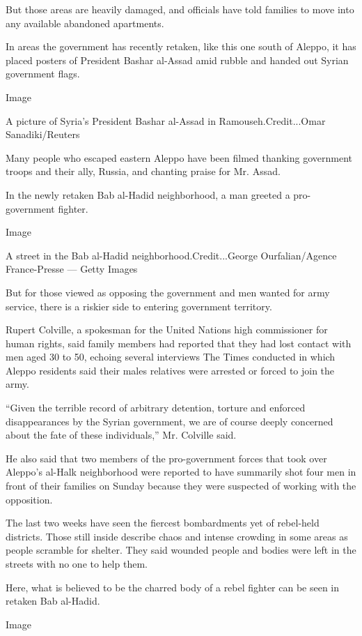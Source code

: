 But those areas are heavily damaged, and officials have told families to
move into any available abandoned apartments.

In areas the government has recently retaken, like this one south of
Aleppo, it has placed posters of President Bashar al-Assad amid rubble
and handed out Syrian government flags.

Image

A picture of Syria's President Bashar al-Assad in Ramouseh.Credit...Omar
Sanadiki/Reuters

Many people who escaped eastern Aleppo have been filmed thanking
government troops and their ally, Russia, and chanting praise for Mr.
Assad.

In the newly retaken Bab al-Hadid neighborhood, a man greeted a
pro-government fighter.

Image

A street in the Bab al-Hadid neighborhood.Credit...George
Ourfalian/Agence France-Presse --- Getty Images

But for those viewed as opposing the government and men wanted for army
service, there is a riskier side to entering government territory.

Rupert Colville, a spokesman for the United Nations high commissioner
for human rights, said family members had reported that they had lost
contact with men aged 30 to 50, echoing several interviews The Times
conducted in which Aleppo residents said their males relatives were
arrested or forced to join the army.

``Given the terrible record of arbitrary detention, torture and enforced
disappearances by the Syrian government, we are of course deeply
concerned about the fate of these individuals,'' Mr. Colville said.

He also said that two members of the pro-government forces that took
over Aleppo's al-Halk neighborhood were reported to have summarily shot
four men in front of their families on Sunday because they were
suspected of working with the opposition.

The last two weeks have seen the fiercest bombardments yet of rebel-held
districts. Those still inside describe chaos and intense crowding in
some areas as people scramble for shelter. They said wounded people and
bodies were left in the streets with no one to help them.

Here, what is believed to be the charred body of a rebel fighter can be
seen in retaken Bab al-Hadid.

Image

